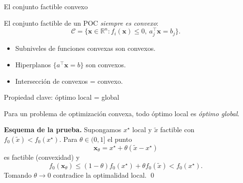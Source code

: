\documentclass[10pt,aspectratio=169]{beamer}
\newcommand{\R}{\mathbb{R}}
\newcommand{\x}{\mathbf{x}}
\newcommand{\0}{\mathbf{0}}
\begin{document}
\begin{frame}{El conjunto factible convexo}
  \begin{alertblock}{}
    El conjunto factible de un POC \emph{siempre es convexo}:
    \[
      \mathcal{C}=\{\x\in\R^n: f_i(\x)\le 0,\ a_j^\top\x=b_j\}.
    \]
  \end{alertblock}
  \begin{itemize}
    \item Subniveles de funciones convexas son convexos.
    \item Hiperplanos $\{a^\top\x=b\}$ son convexos.
    \item Intersección de convexos = convexo.
  \end{itemize}
  \vspace{0.4em}
  \begin{flushright}
  \end{flushright}
\end{frame}

\begin{frame}{Propiedad clave: óptimo local = global}
  \begin{theorem}[POC]
    Para un problema de optimización convexa, todo óptimo local es
    \emph{óptimo global}.
  \end{theorem}
  \vspace{0.3em}
  \textbf{Esquema de la prueba.}
  Supongamos $x^\star$ local y $\tilde x$ factible con $f_0(\tilde x)<f_0(x^\star)$.
  Para $\theta\in(0,1]$ el punto
  \[
    \x_\theta = x^\star+\theta(\tilde x-x^\star)
  \]
  es factible (convexidad) y
  \[
    f_0(\x_\theta)\le (1-\theta)f_0(x^\star)+\theta f_0(\tilde x)
      < f_0(x^\star).
  \]
  Tomando $\theta\to 0$ contradice la optimalidad local.
  \qed
\end{frame}
\end{document}
